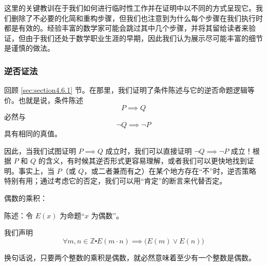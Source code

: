 这里的关键教训在于我们如何进行临时性工作并在证明中以不同的方式呈现它。我们删除了不必要的化简和重构步骤，但我们也注意到为什么每个步骤在我们执行时都是有效的。经验丰富的数学家可能会跳过其中几个步骤，并将其留给读者来验证，但由于我们还处于数学职业生涯的早期，因此我们认为展示尽可能丰富的细节是谨慎的做法。

\subsubsection*{逆否证法}

回顾 \ref{sec:section4.6.1} 节。在那里，我们证明了条件陈述与它的逆否命题逻辑等价。也就是说，条件陈述
\[P \implies Q\]
必然与
\[\neg Q \implies \neg P\]
具有相同的真值。

因此，当我们试图证明 $P \implies Q$ 成立时，我们可以直接证明 $\neg Q \implies \neg P$ 成立！根据 $P$ 和 $Q$ 的含义，有时候其逆否形式更容易理解，或者我们可以更快地找到证明。事实上，当 $P$（或 $Q$，或二者兼而有之）在某个地方存在``不''时，逆否策略特别有用；通过考虑它的否定，我们可以用``肯定''的断言来代替否定。

\begin{center}
    \noindent {}
\end{center}

\begin{example}
    偶数的乘积：

    陈述：令 $E(x)$ 为命题``$x$ 为偶数''。

    我们声明
    \[\forall m,n \in \mathbb{Z} \centerdot E(m \cdot n) \implies \big(E(m) \lor E(n)\big)\]

    换句话说，只要两个整数的乘积是偶数，就必然意味着至少有一个整数是偶数。
\end{example}

